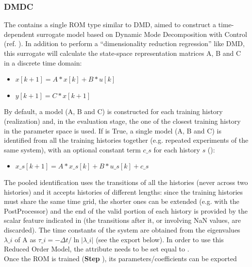 \subsubsection{DMDC}
  The  contains a single ROM type similar to DMD, aimed to         construct a time-
  dependent surrogate model based on Dynamic         Mode Decomposition with Control (ref.
  \cite{proctor2016dynamic}).         In addition to perform a ``dimensionality reduction
  regression'' like DMD, this surrogate will         calculate the state-space representation
  matrices A, B and  C in a discrete time domain:         \begin{itemize}           \item
  $x[k+1]=A*x[k]+B*u[k]$           \item $y[k+1]=C*x[k+1]$         \end{itemize}         By default,
  a model (A, B and C) is constructed for each training history (realization) and, in the
  evaluation stage, the one of the closest training history in the parameter space is used.
  If  is True, a single model (A, B and C) is identified from all the training
  histories         together (e.g. repeated experiments of the same system), with an optional
  constant term $c\_s$ for each         history $s$ ():
  \begin{itemize}           \item $x\_s[k+1]=A*x\_s[k]+B*u\_s[k]+c\_s$         \end{itemize}         The
  pooled identification uses the transitions of all the histories (never across two histories) and
  it         accepts histories of different lengths: since the training histories must share the
  same time grid, the         shorter ones can be extended (e.g. with the 
  PostProcessor) and the end of         the valid portion of each history is provided by the scalar
  feature indicated in          (the transitions after it, or involving NaN
  values, are discarded).         The time constants of the system are obtained from the eigenvalues
  $\lambda\_i$ of A as         $\tau\_i = -\Delta t / \ln|\lambda\_i|$ (see the 
  export below).          In order to use this Reduced Order Model, the  attribute
   needs to be set equal to .         \\         Once the ROM  is
  trained (\textbf{Step} ), its         parameters/coefficients can be exported
